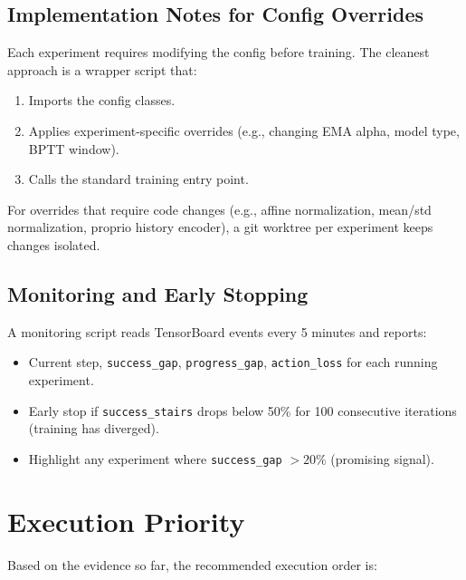 \documentclass[11pt,a4paper]{article}
\begin{document}
\subsection{Implementation Notes for Config Overrides}

Each experiment requires modifying the config before training.  The cleanest
approach is a wrapper script that:

\begin{enumerate}[nosep]
  \item Imports the config classes.
  \item Applies experiment-specific overrides (e.g., changing EMA alpha,
        model type, BPTT window).
  \item Calls the standard training entry point.
\end{enumerate}

For overrides that require code changes (e.g., affine normalization,
mean/std normalization, proprio history encoder), a git worktree per
experiment keeps changes isolated.

\subsection{Monitoring and Early Stopping}

A monitoring script reads TensorBoard events every 5 minutes and reports:
\begin{itemize}[nosep]
  \item Current step, \texttt{success\_gap}, \texttt{progress\_gap},
        \texttt{action\_loss} for each running experiment.
  \item Early stop if \texttt{success\_stairs} drops below 50\% for 100
        consecutive iterations (training has diverged).
  \item Highlight any experiment where \texttt{success\_gap} $> 20\%$
        (promising signal).
\end{itemize}

\section{Execution Priority}

Based on the evidence so far, the recommended execution order is:
\end{document}
